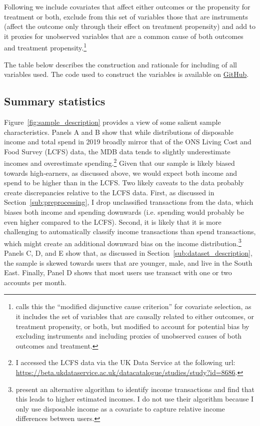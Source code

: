 Following \citet{vanderweele2019principles} we include covariates that affect
either outcomes or the propensity for treatment or both, exclude from this
set of variables those that are instruments (affect the outcome only through their effect on
treatment propensity) and add to it proxies for unobserved variables that are a
common cause of both outcomes and treatment propensity.\footnote{
\citet{vanderweele2019principles} calls this the ``modified disjunctive cause
criterion'' for covariate selection, as it includes the set of variables that are causally
related to either outcomes, or treatment propensity, or both, but modified to
account for potential bias by excluding instruments and including proxies of
unobserved causes of both outcomes and treatment.}

The table below describes the construction and rationale for including of all
variables used. The code used to construct the variables is available on
\href{https://github.com/fabiangunzinger/mdb_eval/blob/d094f8cd364f64bbe3d4e644abbff726af86de2f/src/data/aggregators.py}{GitHub}.




\subsection{Summary statistics}%
\label{sub:summary_statistics}

Figure~\ref{fig:sample_description} provides a view of some salient sample
characteristics. Panels A and B show that while distributions of disposable
income and total spend in 2019 broadly mirror that of the ONS Living Cost and
Food Survey (LCFS) data, the MDB data tends to slightly underestimate incomes
and overestimate spending.\footnote{I accessed the LCFS data via the UK Data
Service at the following url:
\url{https://beta.ukdataservice.ac.uk/datacatalogue/studies/study?id=8686}.}
Given that our sample is likely biased towards high-earners, as discussed
above, we would expect both income and spend to be higher than in the LCFS. Two
likely caveats to the data probably create discrepancies relative to the LCFS
data. First, as discussed in Section~\ref{sub:preprocessing}, I drop
unclassified transactions from the data, which biases both income and spending
downwards (i.e. spending would probably be even higher compared to the LCFS).
Second, it is likely that it is more challenging to automatically classify
income transactions than spend transactions, which might create an additional
downward bias on the income distribution.\footnote{\citet{bourquin2020effects}
    present an alternative algorithm to identify income transactions and find
that this leads to higher estimated incomes. I do not use their algorithm
because I only use disposable income as a covariate to capture relative income
differences between users.} Panels C, D, and E show that, as discussed in
Section~\ref{sub:dataset_description}, the sample is skewed towards users that
are younger, male, and live in the South East. Finally, Panel D shows that most
users use transact with one or two accounts per month.

